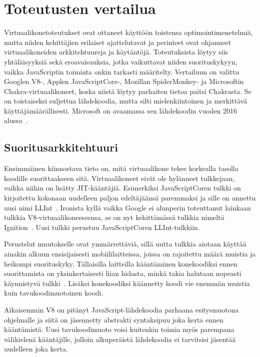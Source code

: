 \section{Toteutusten vertailua}

Virtuaalikonetoteutukset ovat ottaneet käyttöön toistensa optimointimenetelmiä, mutta niiden kehittäjien erilaiset ajattelutavat ja perinteet ovat ohjanneet virtuaalikoneiden arkkitehtuureja ja käytäntöjä. Toteutuksista löytyy siis yhtäläisyyksiä sekä eroavaisuuksia, jotka vaikuttavat niiden suorituskykyyn, vaikka JavaScriptin toiminta onkin tarkasti määritelty. Vertailuun on valittu Googlen V8-, Applen JavaScriptCore-, Mozillan SpiderMonkey- ja Microsoftin Chakra-virtuaalikoneet, koska niistä löytyy parhaiten tietoa paitsi Chakrasta. Se on toistaiseksi suljettua lähdekoodia, mutta silti mielenkiintoinen ja merkittävä käyttäjämäärällisesti. Microsoft on avaamassa sen lähdekoodin vuoden 2016 alussa~\cite{chakraopen}.

\subsection{Suoritusarkkitehtuuri}

Ensimmäinen kiinnostava tieto on, mitä virtuaalikone tekee korkealla tasolla koodille suorittaakseen sitä. Virtuaalikoneet eivät ole hylänneet tulkkejaan, vaikka niihin on lisätty JIT-kääntäjiä. Esimerkiksi JavaScriptCoren tulkki on kirjoitettu kokonaan uudelleen paljon edeltäjäänsä paremmaksi ja sille on annettu uusi nimi LLInt~\cite{llint}. Ironista kyllä vaikka Google ei alunperin toteuttanut lainkaan tulkkia V8-virtuaalikoneeseensa, se on nyt kehittämässä tulkkia nimeltä Ignition~\cite{v8ignition}. Uusi tulkki perustuu JavaScriptCoren LLInt-tulkkiin.

Perustelut muutokselle ovat ymmärrettäviä, sillä uutta tulkkia aiotaan käyttää ainakin alkuun ensisijaisesti mobiililaitteissa, joissa on rajoitettu määrä muistia ja heikompi suorituskyky. Tällaisilla laitteilla kääntäminen konekoodiksi ennen suorittamista on yksinkertaisesti liian hidasta, minkä takia halutaan nopeasti käynnistyvä tulkki~\cite{v8ignition}. Lisäksi konekoodiksi käännetty koodi vie enemmän muistia kuin tavukoodimuotoinen koodi.

Aikaisemmin V8 on pitänyt JavaScript-lähdekoodia parhaana esitysmuotona ohjelmalle ja siitä on jäsennetty abstrakti syntaksipuu joka kerta ennen kääntämistä. Uusi tavukoodimuoto voisi kuitenkin toimia myös parempana välikielenä kääntäjille, jolloin alkuperäistä lähdekoodia ei tarvitsisi jäsentää uudelleen joka kerta.

